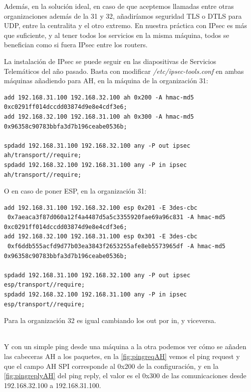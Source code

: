 \documentclass[]{article}
\begin{document}
Además, en la solución ideal, en caso de que aceptemos llamadas entre otras organizaciones además de la 31 y 32, añadiríamos seguridad TLS o DTLS para UDP, entre la centralita y el otro extremo. En nuestra práctica con IPsec es más que suficiente, y al tener todos los servicios en la misma máquina, todos se benefician como si fuera IPsec entre los routers.

\hfill

La instalación de IPsec se puede seguir en las diapositivas de Servicios Telemáticos del año pasado. Basta con modificar \textit{/etc/ipsec-tools.conf} en ambas máquinas añadiendo para AH, en la máquina de la organización 31:

\begin{Verbatim}[frame=single]
add 192.168.31.100 192.168.32.100 ah 0x200 -A hmac-md5 0xc0291ff014dccdd03874d9e8e4cdf3e6;
add 192.168.32.100 192.168.31.100 ah 0x300 -A hmac-md5 0x96358c90783bbfa3d7b196ceabe0536b;

spdadd 192.168.31.100 192.168.32.100 any -P out ipsec ah/transport//require;
spdadd 192.168.32.100 192.168.31.100 any -P in ipsec ah/transport//require;
\end{Verbatim}


O en caso de poner ESP, en la organización 31:

\begin{Verbatim}[frame=single]
add 192.168.31.100 192.168.32.100 esp 0x201 -E 3des-cbc
 0x7aeaca3f87d060a12f4a4487d5a5c3355920fae69a96c831 -A hmac-md5 0xc0291ff014dccdd03874d9e8e4cdf3e6;
add 192.168.32.100 192.168.31.100 esp 0x301 -E 3des-cbc
 0xf6ddb555acfd9d77b03ea3843f2653255afe8eb5573965df -A hmac-md5 0x96358c90783bbfa3d7b196ceabe0536b;

spdadd 192.168.31.100 192.168.32.100 any -P out ipsec esp/transport//require;
spdadd 192.168.32.100 192.168.31.100 any -P in ipsec esp/transport//require;
\end{Verbatim}

Para la organización 32 es igual cambiando los out por in, y viceversa.

\hfill
\\


Y con un simple ping desde una máquina a la otra podemos ver cómo se añaden las cabeceras AH a los paquetes, en la \autoref{fig:pingreqAH} vemos el ping request y que el campo AH SPI corresponde al 0x200 de la configuración, y en la \autoref{fig:pingreplyAH} del ping reply, el valor es el 0x300 de las comunicaciones desde 192.168.32.100 a 192.168.31.100.
\end{document}
